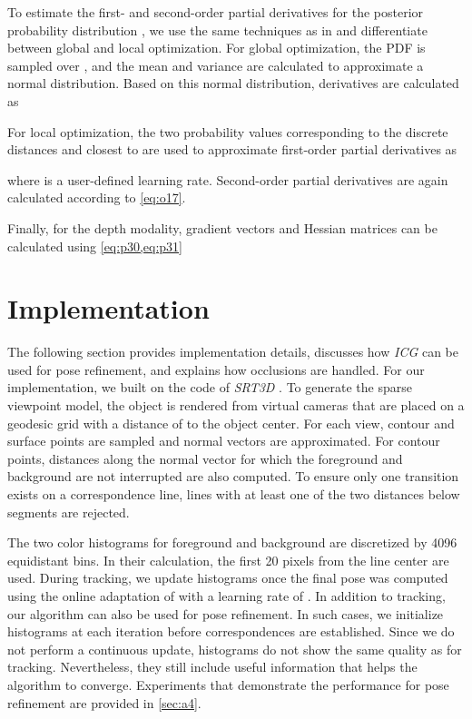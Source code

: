 \documentclass[10pt,twocolumn,letterpaper]{article}
\begin{document}
To estimate the first- and second-order partial derivatives for the posterior probability distribution , we use the same techniques as in \cite{Stoiber2021} and differentiate between global and local optimization.
For global optimization, the \ac{PDF} is sampled over , and the mean  and variance  are calculated to approximate a normal distribution.
Based on this normal distribution, derivatives are calculated as

For local optimization, the two probability values corresponding to the discrete distances  and  closest to  are used to approximate first-order partial derivatives as

where  is a user-defined learning rate.
Second-order partial derivatives are again calculated according to \cref{eq:o17}.

Finally, for the depth modality, gradient vectors and Hessian matrices can be calculated using \cref{eq:p30,eq:p31}




 

\section{Implementation}\label{sec:i}
The following section provides implementation details, discusses how \textit{ICG} can be used for pose refinement, and explains how occlusions are handled.
For our implementation, we built on the code of \textit{SRT3D} \cite{Stoiber2021}.
To generate the sparse viewpoint model, the object is rendered from  virtual cameras that are placed on a geodesic grid with a distance of  to the object center.
For each view, contour and surface points are sampled and normal vectors are approximated.
For contour points, distances along the normal vector for which the foreground and background are not interrupted are also computed.
To ensure only one transition exists on a correspondence line, lines with at least one of the two distances below  segments are rejected.

The two color histograms for foreground and background are discretized by 4096 equidistant bins.
In their calculation, the first 20 pixels from the line center are used.
During tracking, we update histograms once the final pose was computed using the online adaptation of \cite{Bibby2008} with a learning rate of .
In addition to tracking, our algorithm can also be used for pose refinement.
In such cases, we initialize histograms at each iteration before correspondences are established.
Since we do not perform a continuous update, histograms do not show the same quality as for tracking.
Nevertheless, they still include useful information that helps the algorithm to converge.
Experiments that demonstrate the performance for pose refinement are provided in \cref{sec:a4}.
\end{document}

